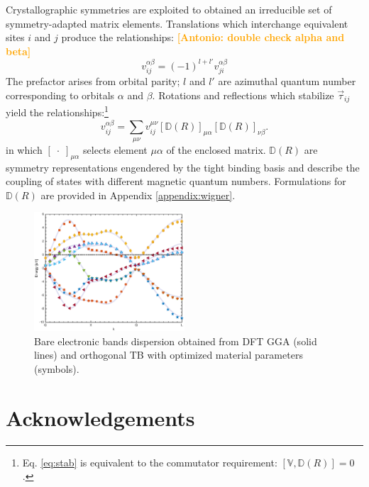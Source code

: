 \documentclass[twocolumn,showpacs,preprintnumbers,superscriptaddress,prb,floatfix,aps,10pt]{revtex4-1}
\newcommand{\abmei}[1]{\textcolor{orange}{ \bf [Antonio: #1] }}
\newcommand*{\wignerD}{\mathbb{D}(R)}
\newcommand*{\bondvec}{\vec{\tau}_{ij}}
\begin{document}
Crystallographic symmetries are exploited to obtained an irreducible set of symmetry-adapted matrix elements. Translations which interchange equivalent sites $i$ and $j$ produce the relationships:
%
\abmei{double check alpha and beta}
\begin{equation}
\label{eq:intrinsic}
v_{ij}^{\alpha\beta} = (-1)^{l+l'}v_{ji}^{\alpha\beta}
\end{equation}
%
The prefactor arises from orbital parity; $l$ and $l'$ are azimuthal quantum number corresponding to orbitals $\alpha$ and $\beta$. Rotations and reflections which stabilize $\bondvec$ yield the relationships:\footnote{Eq. \ref{eq:stab} is equivalent to the commutator requirement: $[\mathbb{V},\wignerD] = 0$.}
%
\begin{equation}
\label{eq:stab}
v_{ij}^{\alpha\beta} = \sum_{\mu\nu} v_{ij}^{\mu\nu} \left[\wignerD\right]_{\mu\alpha} \left[\wignerD\right]_{\nu\beta}.
\end{equation}
%
in which $\left[\phantom{.}\cdot\phantom{.}\right]_{\mu\alpha}$ selects element $\mu\alpha$ of the enclosed matrix. $\wignerD$ are symmetry representations engendered by the tight binding basis and describe the coupling of states with different magnetic quantum numbers. Formulations for $\wignerD$ are provided in Appendix \ref{appendix:wigner}.
%








\begin{figure}
\label{fig:kappa_vs_t}
\includegraphics[width=0.5\textwidth]{band_structure.eps}
\caption{Bare electronic bands dispersion obtained from DFT GGA (solid lines) and orthogonal TB with optimized material parameters (symbols). } 
\end{figure}



\section{Acknowledgements}
\end{document}
